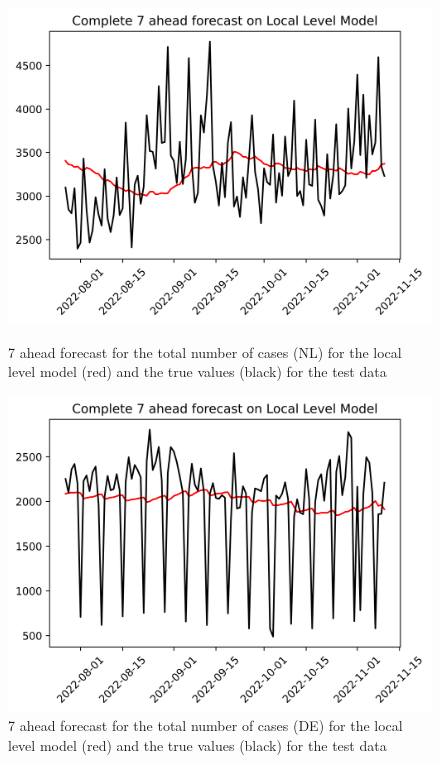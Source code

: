 
\begin{figure}

\begin{minipage}{.32\textwidth}
  \centering
  \includegraphics[width=\linewidth]{pics/7_ah/Complete_7_ahead_Local Level Model.png}
  \caption{7 ahead forecast for the total number of cases (NL) for the local level model (red) and the true values (black) for the test data}
  \label{fig:tot_cases_fc_7_LLM}
\end{minipage}
\begin{minipage}{.32\textwidth}
  \centering
  \includegraphics[width=\linewidth]{pics/7_ah/DE_Complete_7_ahead_Local Level Model.png}
  \caption{7 ahead forecast for the total number of cases (DE) for the local level model (red) and the true values (black) for the test data}

\end{minipage}
\end{figure}
